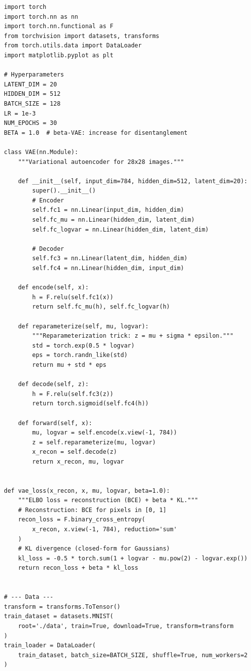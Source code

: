 \begin{codeblock}[title=\textbf{Complete VAE with training and visualization}]
\begin{verbatim}
import torch
import torch.nn as nn
import torch.nn.functional as F
from torchvision import datasets, transforms
from torch.utils.data import DataLoader
import matplotlib.pyplot as plt

# Hyperparameters
LATENT_DIM = 20
HIDDEN_DIM = 512
BATCH_SIZE = 128
LR = 1e-3
NUM_EPOCHS = 30
BETA = 1.0  # beta-VAE: increase for disentanglement

class VAE(nn.Module):
    """Variational autoencoder for 28x28 images."""

    def __init__(self, input_dim=784, hidden_dim=512, latent_dim=20):
        super().__init__()
        # Encoder
        self.fc1 = nn.Linear(input_dim, hidden_dim)
        self.fc_mu = nn.Linear(hidden_dim, latent_dim)
        self.fc_logvar = nn.Linear(hidden_dim, latent_dim)

        # Decoder
        self.fc3 = nn.Linear(latent_dim, hidden_dim)
        self.fc4 = nn.Linear(hidden_dim, input_dim)

    def encode(self, x):
        h = F.relu(self.fc1(x))
        return self.fc_mu(h), self.fc_logvar(h)

    def reparameterize(self, mu, logvar):
        """Reparameterization trick: z = mu + sigma * epsilon."""
        std = torch.exp(0.5 * logvar)
        eps = torch.randn_like(std)
        return mu + std * eps

    def decode(self, z):
        h = F.relu(self.fc3(z))
        return torch.sigmoid(self.fc4(h))

    def forward(self, x):
        mu, logvar = self.encode(x.view(-1, 784))
        z = self.reparameterize(mu, logvar)
        x_recon = self.decode(z)
        return x_recon, mu, logvar


def vae_loss(x_recon, x, mu, logvar, beta=1.0):
    """ELBO loss = reconstruction (BCE) + beta * KL."""
    # Reconstruction: BCE for pixels in [0, 1]
    recon_loss = F.binary_cross_entropy(
        x_recon, x.view(-1, 784), reduction='sum'
    )
    # KL divergence (closed-form for Gaussians)
    kl_loss = -0.5 * torch.sum(1 + logvar - mu.pow(2) - logvar.exp())
    return recon_loss + beta * kl_loss


# --- Data ---
transform = transforms.ToTensor()
train_dataset = datasets.MNIST(
    root='./data', train=True, download=True, transform=transform
)
train_loader = DataLoader(
    train_dataset, batch_size=BATCH_SIZE, shuffle=True, num_workers=2
)


\end{verbatim}
\end{codeblock}
